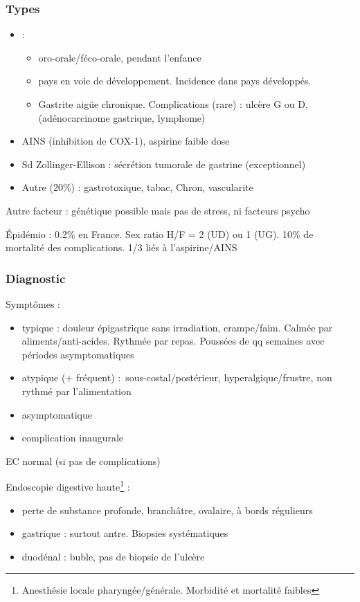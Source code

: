 \documentclass[11pt]{article}
\begin{document}
\subsubsection{Types}
\label{sec:org2b73141}
\begin{itemize}
\item {} : 
\begin{itemize}
\item oro-orale/féco-orale, pendant l'enfance
\item pays en voie de développement. Incidence \dec dans pays développés.
\item Gastrite aigüe \thus chronique. Complications (rare) : ulcère G ou D,
(adénocarcinome gastrique, lymphome)
\end{itemize}
\item AINS (inhibition de COX-1), aspirine faible dose
\item Sd Zollinger-Ellison : sécrétion tumorale de gastrine (exceptionnel)
\item Autre (20\%) :  gastrotoxique, tabac, Chron, vascularite
\end{itemize}
Autre facteur : génétique possible mais pas de stress, ni facteurs psycho

Épidémio : 0.2\% en France. Sex ratio H/F = 2 (UD) ou 1 (UG). 10\% de mortalité
des complications. 1/3 liés à l'aspirine/AINS

\subsubsection{Diagnostic}
\label{sec:orgc93ebea}
Symptômes :
\begin{itemize}
\item typique : douleur épigastrique sans irradiation, crampe/faim. Calmée par
aliments/anti-acides. Rythmée par repas. Poussées de qq semaines avec périodes asymptomatiques
\item atypique (+ fréquent) : sous-costal/postérieur, hyperalgique/frustre, non
rythmé par l'alimentation
\item asymptomatique
\item complication inaugurale
\end{itemize}

EC normal (si pas de complications)

Endoscopie digestive haute\footnote{Anesthésie locale pharyngée/générale. Morbidité et mortalité faibles} :
\begin{itemize}
\item perte de substance profonde, branchâtre, ovalaire, à bords régulieurs
\item gastrique : surtout antre. Biopsies systématiques
\item duodénal : buble, pas de biopsie de l'ulcère
\end{itemize}
\end{document}
